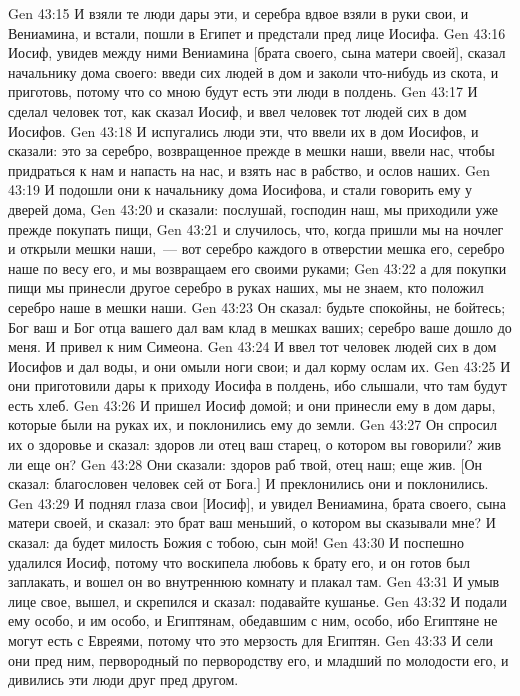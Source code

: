 \vs Gen 43:15 И взяли те люди дары эти, и серебра вдвое взяли в руки свои, и Вениамина, и встали, пошли в Египет и предстали пред лице Иосифа.
\vs Gen 43:16 Иосиф, увидев между ними Вениамина [брата своего, сына матери своей], сказал начальнику дома своего: введи сих людей в дом и заколи что-нибудь из скота, и приготовь, потому что со мною будут есть эти люди в полдень.
\vs Gen 43:17 И сделал человек тот, как сказал Иосиф, и ввел человек тот людей сих в дом Иосифов.
\vs Gen 43:18 И испугались люди эти, что ввели их в дом Иосифов, и сказали: это за серебро, возвращенное прежде в мешки наши, ввели нас, чтобы придраться к нам и напасть на нас, и взять нас в рабство, и ослов наших.
\vs Gen 43:19 И подошли они к начальнику дома Иосифова, и стали говорить ему у дверей дома,
\vs Gen 43:20 и сказали: послушай, господин наш, мы приходили уже прежде покупать пищи,
\vs Gen 43:21 и случилось, что, когда пришли мы на ночлег и открыли мешки наши,~--- вот серебро каждого в отверстии мешка его, серебро наше по весу его, и мы возвращаем его своими руками;
\vs Gen 43:22 а для покупки пищи мы принесли другое серебро в руках наших, мы не знаем, кто положил серебро наше в мешки наши.
\vs Gen 43:23 Он сказал: будьте спокойны, не бойтесь; Бог ваш и Бог отца вашего дал вам клад в мешках ваших; серебро ваше дошло до меня. И привел к ним Симеона.
\vs Gen 43:24 И ввел тот человек людей сих в дом Иосифов и дал воды, и они омыли ноги свои; и дал корму ослам их.
\vs Gen 43:25 И они приготовили дары к приходу Иосифа в полдень, ибо слышали, что там будут есть хлеб.
\vs Gen 43:26 И пришел Иосиф домой; и они принесли ему в дом дары, которые были на руках их, и поклонились ему до земли.
\vs Gen 43:27 Он спросил их о здоровье и сказал: здоров ли отец ваш старец, о котором вы говорили? жив ли еще он?
\vs Gen 43:28 Они сказали: здоров раб твой, отец наш; еще жив. [Он сказал: благословен человек сей от Бога.] И преклонились они и поклонились.
\vs Gen 43:29 И поднял глаза свои [Иосиф], и увидел Вениамина, брата своего, сына матери своей, и сказал: это брат ваш меньший, о котором вы сказывали мне? И сказал: да будет милость Божия с тобою, сын мой!
\vs Gen 43:30 И поспешно удалился Иосиф, потому что воскипела любовь к брату его, и он готов был заплакать, и вошел он во внутреннюю комнату и плакал там.
\vs Gen 43:31 И умыв лице свое, вышел, и скрепился и сказал: подавайте кушанье.
\vs Gen 43:32 И подали ему особо, и им особо, и Египтянам, обедавшим с ним, особо, ибо Египтяне не могут есть с Евреями, потому что это мерзость для Египтян.
\vs Gen 43:33 И сели они пред ним, первородный по первородству его, и младший по молодости его, и дивились эти люди друг пред другом.
